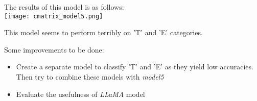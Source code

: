 The results of this model is as follows:\\
\texttt{[image: cmatrix\_model5.png]}

This model seems to perform terribly on 'T' and 'E' categories.

Some improvements to be done:
\begin{itemize}[topsep=0pt]
    \item Create a separate model to classify 'T' and 'E' as they yield low accuracies. Then try to combine these models with \textit{model5}
    \item Evaluate the usefulness of \textit{LLaMA} model
\end{itemize}